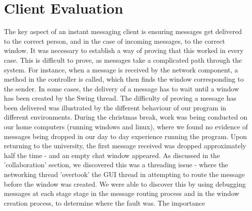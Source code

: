 \section{Client Evaluation}
\label{client_eval}

The key aspect of an instant messaging client is ensuring messages get delivered to the correct person, and in the case of incoming messages, to the correct window. It was necessary to establish a way of proving that this worked in every case. This is difficult to prove, as messages take a complicated path through the system. For instance, when a message is received by the network component, a method in the controller is called, which then finds the window corresponding to the sender. In some cases, the delivery of a message has to wait until a window has been created by the Swing thread. The difficulty of proving a message has been delivered was illustrated by the different behaviour of our program in different environments. During the christmas break, work was being conducted on our home computers (running windows and linux), where we found no evidence of messages being dropped in our day to day experience running the program. Upon returning to the university, the first message received was dropped approximately half the time - and an empty chat window appeared. As discussed in the 'collaboration' section, we discovered this was a threading issue - where the networking thread 'overtook' the GUI thread in attempting to route the message before the window was created. We were able to discover this by using debugging messages at each stage stage in the message routing process and in the window creation process, to determine where the fault was. The importance 






